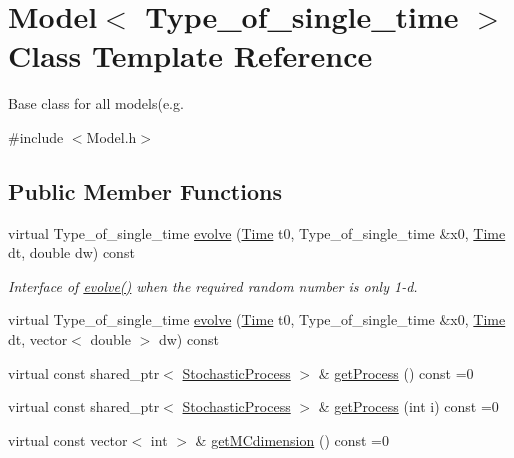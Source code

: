 \hypertarget{class_model}{}\section{Model$<$ Type\+\_\+of\+\_\+single\+\_\+time $>$ Class Template Reference}
\label{class_model}


Base class for all models(e.\+g.  




{\ttfamily \#include $<$Model.\+h$>$}

\subsection*{Public Member Functions}
\begin{DoxyCompactItemize}
\item 
virtual Type\+\_\+of\+\_\+single\+\_\+time \hyperlink{class_model_a18b1fe1476b5adde8d6125e7f6a7f932}{evolve} (\hyperlink{_name_def_8h_ac2d3e0ba793497bcca555c7c2cf64ff3}{Time} t0, Type\+\_\+of\+\_\+single\+\_\+time \&x0, \hyperlink{_name_def_8h_ac2d3e0ba793497bcca555c7c2cf64ff3}{Time} dt, double dw) const
\begin{DoxyCompactList}\small\item\em Interface of \hyperlink{class_model_a18b1fe1476b5adde8d6125e7f6a7f932}{evolve()} when the required random number is only 1-\/d. \end{DoxyCompactList}\item 
virtual Type\+\_\+of\+\_\+single\+\_\+time \hyperlink{class_model_a2bc277990d41a0abc4e2658f94107481}{evolve} (\hyperlink{_name_def_8h_ac2d3e0ba793497bcca555c7c2cf64ff3}{Time} t0, Type\+\_\+of\+\_\+single\+\_\+time \&x0, \hyperlink{_name_def_8h_ac2d3e0ba793497bcca555c7c2cf64ff3}{Time} dt, vector$<$ double $>$ dw) const
\item 
virtual const shared\+\_\+ptr$<$ \hyperlink{class_stochastic_process}{Stochastic\+Process} $>$ \& \hyperlink{class_model_a6f584114ffcbd4eac04a2bbf8e9cede2}{get\+Process} () const =0
\item 
virtual const shared\+\_\+ptr$<$ \hyperlink{class_stochastic_process}{Stochastic\+Process} $>$ \& \hyperlink{class_model_a7b9e58a51a5d244aa7012f1cdb7aebd8}{get\+Process} (int i) const =0
\item 
virtual const vector$<$ int $>$ \& \hyperlink{class_model_a11fb36244c91ca8c36317581b73bca08}{get\+M\+Cdimension} () const =0
\item 

\end{DoxyCompactItemize}
